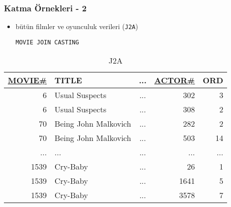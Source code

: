 \documentclass[dvipsnames]{beamer}
\theoremstyle{plain}
\begin{document}
\begin{frame}[fragile]
  \frametitle{Katma Örnekleri - 2}

    \begin{itemize}
      \item bütün filmler ve oyunculuk verileri (\texttt{J2A})

    \begin{lstlisting}
MOVIE JOIN CASTING
    \end{lstlisting}
    \end{itemize}

    \vspace{-10pt}
    \begin{tiny}
    \begin{table}
      \caption{J2A}
      \begin{tabular}{|r|l|c|r|r|}\hline
\underline{MOVIE\#} & TITLE & ... & \underline{ACTOR\#} & ORD\\[2pt]\hline\hline
   6 & Usual Suspects       & ... &                 302 &   3\\\hline
   6 & Usual Suspects       & ... &                 308 &   2\\\hline
  70 & Being John Malkovich & ... &                 282 &   2\\\hline
  70 & Being John Malkovich & ... &                 503 &  14\\\hline
 ... & ...                  & ... &                 ... & ...\\\hline
1539 & Cry-Baby             & ... &                  26 &   1\\\hline
1539 & Cry-Baby             & ... &                1641 &   5\\\hline
1539 & Cry-Baby             & ... &                3578 &   7\\\hline
      \end{tabular}
    \end{table}
    \end{tiny}
\end{frame}
\end{document}
